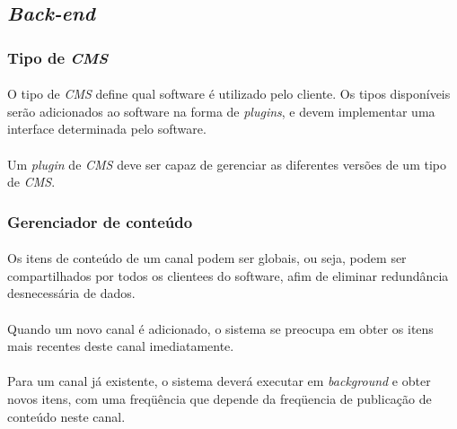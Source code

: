 \documentclass[a4paper,12pt]{article}
\def\cms{\emph{CMS}}
\begin{document}
\subsection{\emph{Back-end}}

\subsubsection{Tipo de \cms{}}

\paragraph{}
O tipo de \cms{} define qual software é utilizado pelo cliente. Os tipos
disponíveis serão adicionados ao software na forma de \emph{plugins}, e devem
implementar uma interface determinada pelo software.


\paragraph{}
Um \emph{plugin} de \cms{} deve ser capaz de gerenciar as diferentes versões de
um tipo de \cms{}.

\subsubsection{Gerenciador de conteúdo}

\paragraph{}
Os itens de conteúdo de um canal podem ser globais, ou seja, podem ser
compartilhados por todos os clientees do software, afim de eliminar redundância
desnecessária de dados.

\paragraph{}
Quando um novo canal é adicionado, o sistema se preocupa em obter os itens mais
recentes deste canal imediatamente.

\paragraph{}
Para um canal já existente, o sistema deverá executar em \emph{background} e
obter novos itens, com uma freqüência que depende da freqüencia de publicação
de conteúdo neste canal.
\end{document}
